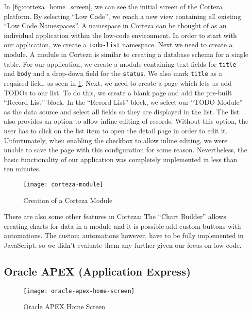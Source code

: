 \documentclass[runningheads]{llncs}
\begin{document}
In \cref{fig:corteza_home_screen}, we can see the initial screen of the Corteza platform. By selecting “Low Code”, we reach a new view containing all existing “Low Code Namespaces”. A namespace in Corteza can be thought of as an individual application within the low-code environment. In order to start with our application, we create a \texttt{todo-list} namespace. Next we need to create a module. A module in Corteza is similar to creating a database schema for a single table. For our application, we create a module containing text fields for \texttt{title} and \texttt{body} and a drop-down field for the \texttt{status}. We also mark \texttt{title} as a required field, as seen in \cref{fig:corteza_module}. Next, we need to create a page which lets us add TODOs to our list. To do this, we create a blank page and add the pre-built “Record List” block. In the “Record List” block, we select our “TODO Module” as the data source and select all fields so they are displayed in the list. The list also provides an option to allow inline editing of records. Without this option, the user has to click on the list item to open the detail page in order to edit it. Unfortunately, when enabling the checkbox to allow inline editing, we were unable to save the page with this configuration for some reason. Nevertheless, the basic functionality of our application was completely implemented in less than ten minutes.

\begin{figure}
  \centering
  \texttt{[image: corteza-module]}
  \caption{Creation of a Corteza Module}
  \label{fig:corteza_module}
\end{figure}

There are also some other features in Corteza: The “Chart Builder” allows creating charts for data in a module and it is possible add custom buttons with automations. The custom automations however, have to be fully implemented in JavaScript, so we didn't evaluate them any further given our focus on low-code.

\subsection{Oracle APEX (Application Express)}

\begin{figure}
  \centering
  \texttt{[image: oracle-apex-home-screen]}
  \caption{Oracle APEX Home Screen}
  \label{fig:oracle_apex_home_screen}
\end{figure}
\end{document}
